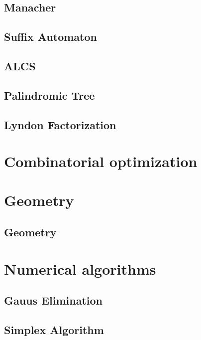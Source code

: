 \subsection{Manacher}
\raggedbottom
\hrulefill
\subsection{Suffix Automaton}
\raggedbottom
\hrulefill
\subsection{ALCS}
\raggedbottom
\hrulefill
\subsection{Palindromic Tree}
\raggedbottom
\hrulefill
\subsection{Lyndon Factorization}
\raggedbottom
\hrulefill

\section{Combinatorial optimization}

\section{Geometry}
\subsection{Geometry}
\raggedbottom
\hrulefill

\section{Numerical algorithms}
\subsection{Gauus Elimination}
\raggedbottom
\hrulefill
\subsection{Simplex Algorithm}
\raggedbottom
\hrulefill
